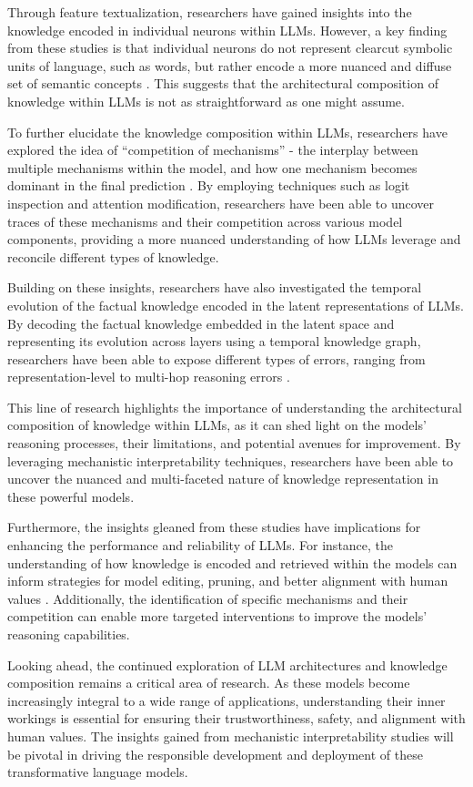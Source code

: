 \documentclass[11pt]{article}
\begin{document}
Through feature textualization, researchers have gained insights into the knowledge encoded in individual neurons within LLMs. However, a key finding from these studies is that individual neurons do not represent clearcut symbolic units of language, such as words, but rather encode a more nuanced and diffuse set of semantic concepts \cite{ref243}. This suggests that the architectural composition of knowledge within LLMs is not as straightforward as one might assume.

To further elucidate the knowledge composition within LLMs, researchers have explored the idea of ``competition of mechanisms'' - the interplay between multiple mechanisms within the model, and how one mechanism becomes dominant in the final prediction \cite{ref185}. By employing techniques such as logit inspection and attention modification, researchers have been able to uncover traces of these mechanisms and their competition across various model components, providing a more nuanced understanding of how LLMs leverage and reconcile different types of knowledge.

Building on these insights, researchers have also investigated the temporal evolution of the factual knowledge encoded in the latent representations of LLMs. By decoding the factual knowledge embedded in the latent space and representing its evolution across layers using a temporal knowledge graph, researchers have been able to expose different types of errors, ranging from representation-level to multi-hop reasoning errors \cite{ref244}.

This line of research highlights the importance of understanding the architectural composition of knowledge within LLMs, as it can shed light on the models' reasoning processes, their limitations, and potential avenues for improvement. By leveraging mechanistic interpretability techniques, researchers have been able to uncover the nuanced and multi-faceted nature of knowledge representation in these powerful models.

Furthermore, the insights gleaned from these studies have implications for enhancing the performance and reliability of LLMs. For instance, the understanding of how knowledge is encoded and retrieved within the models can inform strategies for model editing, pruning, and better alignment with human values \cite{ref237}. Additionally, the identification of specific mechanisms and their competition can enable more targeted interventions to improve the models' reasoning capabilities.

Looking ahead, the continued exploration of LLM architectures and knowledge composition remains a critical area of research. As these models become increasingly integral to a wide range of applications, understanding their inner workings is essential for ensuring their trustworthiness, safety, and alignment with human values. The insights gained from mechanistic interpretability studies will be pivotal in driving the responsible development and deployment of these transformative language models.
\end{document}
